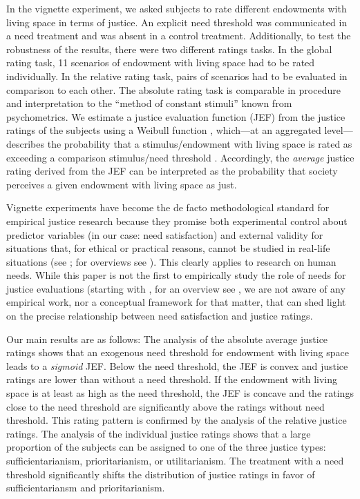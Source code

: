 \documentclass[12pt]{scrartcl}
\begin{document}
In the vignette experiment, we asked subjects to rate different endowments with living space in terms of justice.
An explicit need threshold was communicated in a need treatment and was absent in a control treatment.
Additionally, to test the robustness of the results, there were two different ratings tasks.
In the global rating task, 11 scenarios of endowment with living space had to be rated individually.
In the relative rating task, pairs of scenarios had to be evaluated in comparison to each other.
The absolute rating task is comparable in procedure and interpretation to the ``method of constant stimuli'' known from psychometrics.
We estimate a justice evaluation function (JEF) from the justice ratings of the subjects using a Weibull function \citep{wichmann_psychometric_2001,mortensen_additive_2002}, which---at an aggregated level---describes the probability that a stimulus/endowment with living space is rated as exceeding a comparison stimulus/need threshold \citep[p.~2503]{treutwein_adaptive_1995}.
Accordingly, the \textit{average} justice rating derived from the JEF can be interpreted as the probability that society perceives a given endowment with living space as just.

Vignette experiments have become the de facto methodological standard for empirical justice research because they promise both experimental control about predictor variables (in our case: need satisfaction) and external validity for situations that, for ethical or practical reasons, cannot be studied in real-life situations (see \citealp{bardsley_experimental_2009}; for overviews see \citealp{traub_friedman_2005,gaertner_empirical_2012}).
This clearly applies to research on human needs.
While this paper is not the first to empirically study the role of needs for justice evaluations (starting with \citealp{yaari_dividing_1984}, for an overview see \citep[see][]{traub_need-based_2020}, we are not aware of any empirical work, nor a conceptual framework for that matter, that can shed light on the precise relationship between need satisfaction and justice ratings.

Our main results are as follows: The analysis of the absolute average justice ratings shows that an exogenous need threshold for endowment with living space leads to a \textit{sigmoid} JEF.
Below the need threshold, the JEF is convex and justice ratings are lower than without a need threshold.
If the endowment with living space is at least as high as the need threshold, the JEF is concave and the ratings close to the need threshold are significantly above the ratings without need threshold.
This rating pattern is confirmed by the analysis of the relative justice ratings.
The analysis of the individual justice ratings shows that a large proportion of the subjects can be assigned to one of the three justice types: sufficientarianism, prioritarianism, or utilitarianism.
The treatment with a need threshold significantly shifts the distribution of justice ratings in favor of sufficientariansm and prioritarianism.
\end{document}
